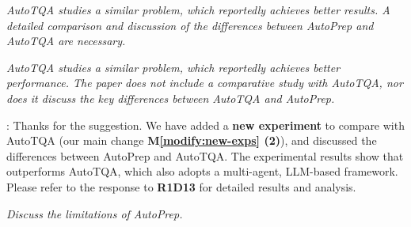 

\begin{shaded}
{
\emph{AutoTQA studies a similar problem, which reportedly achieves better results. A detailed comparison and discussion of the differences between AutoPrep and AutoTQA are necessary.}

\emph{AutoTQA studies a similar problem, which reportedly achieves better performance. The paper does not include a comparative study with AutoTQA, nor does it discuss the key differences between AutoTQA and AutoPrep.}

}
\end{shaded}

: 
Thanks for the suggestion. 
We have added a \textbf{new experiment} to compare with AutoTQA (our main change \textbf{M\ref{modify:new-exps} (2)}), and discussed the differences between AutoPrep and AutoTQA.
The experimental results show that \sys outperforms AutoTQA, which also adopts a multi-agent, LLM-based framework.
Please refer to the response to \textbf{R1D13} for detailed results and analysis. 


\begin{shaded}
{
\emph{Discuss the limitations of AutoPrep.}
}
\end{shaded}

